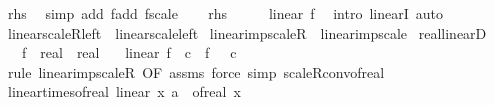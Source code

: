 \begin{isabellebody}
\ {\isachardoublequoteopen}{\isacharquery}{\kern0pt}rhs{\isachardoublequoteclose}\ \isamarkupfalse%
\ {\isacharparenleft}{\kern0pt}simp\ add{\isacharcolon}{\kern0pt}\ f{\isachardot}{\kern0pt}add\ f{\isachardot}{\kern0pt}scale{\isacharparenright}{\kern0pt}\isanewline
{}\isamarkupfalse%
\isanewline
\ \ \isamarkupfalse%
\ {\isachardoublequoteopen}{\isacharquery}{\kern0pt}rhs{\isachardoublequoteclose}\isanewline
\ \ \isamarkupfalse%
\ \isamarkupfalse%
\ {\isachardoublequoteopen}linear\ f{\isachardoublequoteclose}\ \isamarkupfalse%
\ {\isacharparenleft}{\kern0pt}intro\ linearI{\isacharparenright}{\kern0pt}\ auto\isanewline
{}\isamarkupfalse%
%
\endisatagproof
{\isafoldproof}%
%
\isadelimproof
\isanewline
%
\endisadelimproof
\isanewline
{}\isamarkupfalse%
\ linear{\isacharunderscore}{\kern0pt}scaleR{\isacharunderscore}{\kern0pt}left\ {\isacharequal}{\kern0pt}\ linear{\isacharunderscore}{\kern0pt}scale{\isacharunderscore}{\kern0pt}left\isanewline
{}\isamarkupfalse%
\ linear{\isacharunderscore}{\kern0pt}imp{\isacharunderscore}{\kern0pt}scaleR\ {\isacharequal}{\kern0pt}\ linear{\isacharunderscore}{\kern0pt}imp{\isacharunderscore}{\kern0pt}scale\isanewline
\isanewline
{}\isamarkupfalse%
\ real{\isacharunderscore}{\kern0pt}linearD{\isacharcolon}{\kern0pt}\isanewline
\ \ \ f\ {\isacharcolon}{\kern0pt}{\isacharcolon}{\kern0pt}\ {\isachardoublequoteopen}real\ {\isasymRightarrow}\ real{\isachardoublequoteclose}\isanewline
\ \ \ {\isachardoublequoteopen}linear\ f{\isachardoublequoteclose}\ \ c\ \ {\isachardoublequoteopen}f\ {\isacharequal}{\kern0pt}\ {\isacharparenleft}{\kern0pt}{\isacharasterisk}{\kern0pt}{\isacharparenright}{\kern0pt}\ c{\isachardoublequoteclose}\isanewline
%
\isadelimproof
\ \ %
\endisadelimproof
%
\isatagproof
{}\isamarkupfalse%
\ {\isacharparenleft}{\kern0pt}rule\ linear{\isacharunderscore}{\kern0pt}imp{\isacharunderscore}{\kern0pt}scaleR\ {\isacharbrackleft}{\kern0pt}OF\ assms{\isacharbrackright}{\kern0pt}{\isacharparenright}{\kern0pt}\ {\isacharparenleft}{\kern0pt}force\ simp{\isacharcolon}{\kern0pt}\ scaleR{\isacharunderscore}{\kern0pt}conv{\isacharunderscore}{\kern0pt}of{\isacharunderscore}{\kern0pt}real{\isacharparenright}{\kern0pt}%
\endisatagproof
{\isafoldproof}%
%
\isadelimproof
\isanewline
%
\endisadelimproof
\isanewline
{}\isamarkupfalse%
\ linear{\isacharunderscore}{\kern0pt}times{\isacharunderscore}{\kern0pt}of{\isacharunderscore}{\kern0pt}real{\isacharcolon}{\kern0pt}\ {\isachardoublequoteopen}linear\ {\isacharparenleft}{\kern0pt}{\isasymlambda}x{\isachardot}{\kern0pt}\ a\ {\isacharasterisk}{\kern0pt}\ of{\isacharunderscore}{\kern0pt}real\ x{\isacharparenright}{\kern0pt}{\isachardoublequoteclose}\isanewline

\end{isabellebody}
